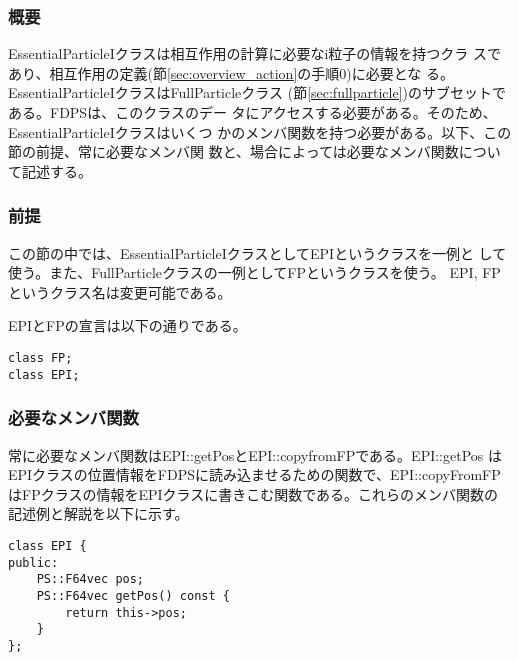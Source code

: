 \subsubsection{概要}

EssentialParticleIクラスは相互作用の計算に必要なi粒子の情報を持つクラ
スであり、相互作用の定義(節\ref{sec:overview_action}の手順0)に必要とな
る。EssentialParticleIクラスはFullParticleクラス
(節\ref{sec:fullparticle})のサブセットである。FDPSは、このクラスのデー
タにアクセスする必要がある。そのため、EssentialParticleIクラスはいくつ
かのメンバ関数を持つ必要がある。以下、この節の前提、常に必要なメンバ関
数と、場合によっては必要なメンバ関数について記述する。

\subsubsection{前提}

この節の中では、EssentialParticleIクラスとしてEPIというクラスを一例と
して使う。また、FullParticleクラスの一例としてFPというクラスを使う。
EPI, FPというクラス名は変更可能である。

EPIとFPの宣言は以下の通りである。
\begin{screen}
\begin{verbatim}
class FP;
class EPI;
\end{verbatim}
\end{screen}

\subsubsection{必要なメンバ関数}


常に必要なメンバ関数はEPI::getPosとEPI::copyfromFPである。EPI::getPos
はEPIクラスの位置情報をFDPSに読み込ませるための関数で、EPI::copyFromFP
はFPクラスの情報をEPIクラスに書きこむ関数である。これらのメンバ関数の
記述例と解説を以下に示す。


\begin{screen}
\begin{verbatim}
class EPI {
public:
    PS::F64vec pos;
    PS::F64vec getPos() const {
        return this->pos;
    }
};
\end{verbatim}
\end{screen}

